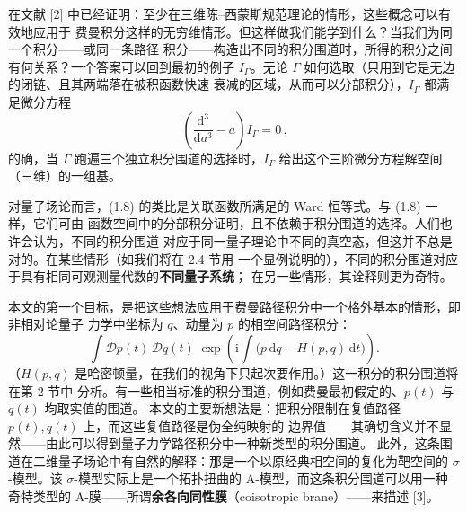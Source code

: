 \documentclass[11pt,a4paper,UTF8]{ctexart}
\theoremstyle{plain}
\theoremstyle{definition}
\newcommand{\dd}{\mathrm{d}}
\newcommand{\ee}{\mathrm{e}}
\newcommand{\ii}{\mathrm{i}}
\renewcommand{\Re}{\operatorname{Re}}
\begin{document}
在文献 [2] 中已经证明：至少在三维陈--西蒙斯规范理论的情形，这些概念可以有效地应用于
费曼积分这样的无穷维情形。但这样做我们能学到什么？当我们为同一个积分——或同一条路径
积分——构造出不同的积分围道时，所得的积分之间有何关系？一个答案可以回到最初的例子
$I_{\Gamma}$。无论 $\Gamma$ 如何选取（只用到它是无边的闭链、且其两端落在被积函数快速
衰减的区域，从而可以分部积分），$I_{\Gamma}$ 都满足微分方程
\begin{equation}
  \left(\frac{\dd^{3}}{\dd a^{3}} - a\right) I_{\Gamma} = 0\,.
  \tag{1.8}
\end{equation}
的确，当 $\Gamma$ 跑遍三个独立积分围道的选择时，$I_{\Gamma}$ 给出这个三阶微分方程解空间
（三维）的一组基。


对量子场论而言，(1.8) 的类比是关联函数所满足的 Ward 恒等式。与 (1.8) 一样，它们可由
函数空间中的分部积分证明，且不依赖于积分围道的选择。人们也许会认为，不同的积分围道
对应于同一量子理论中不同的真空态，但这并不总是对的。在某些情形（如我们将在 2.4 节用
一个显例说明的），不同的积分围道对应于具有相同可观测量代数的\textbf{不同量子系统}；
在另一些情形，其诠释则更为奇特。


本文的第一个目标，是把这些想法应用于费曼路径积分中一个格外基本的情形，即非相对论量子
力学中坐标为 $q$、动量为 $p$ 的相空间路径积分：
\begin{equation}
  \int \mathcal{D}p(t)\,\mathcal{D}q(t)\;
  \exp\left(\ii \int \bigl(p\,\dd q - H(p,q)\,\dd t\bigr)\right).
  \tag{1.9}
\end{equation}
（$H(p,q)$ 是哈密顿量，在我们的视角下只起次要作用。）这一积分的积分围道将在第 2 节中
分析。有一些相当标准的积分围道，例如费曼最初假定的、$p(t)$ 与 $q(t)$ 均取实值的围道。
本文的主要新想法是：把积分限制在复值路径 $p(t),q(t)$ 上，而这些复值路径是伪全纯映射的
边界值——其确切含义并不显然——由此可以得到量子力学路径积分中一种新类型的积分围道。
此外，这条围道在二维量子场论中有自然的解释：那是一个以原经典相空间的复化为靶空间的
$\sigma$-模型。该 $\sigma$-模型实际上是一个拓扑扭曲的 A-模型，而这条积分围道可以用一种
奇特类型的 A-膜——所谓\textbf{余各向同性膜}（coisotropic brane）——来描述 [3]。
\end{document}
